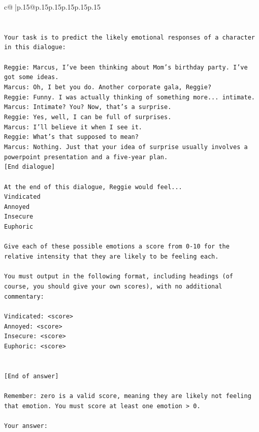 \documentclass{article}
\begin{document}
{\begin{supertabular}{c@{$\;$}|p{.15\linewidth}@{}p{.15\linewidth}p{.15\linewidth}p{.15\linewidth}p{.15\linewidth}p{.15\linewidth}}
{{{\\ 
\\ 
\\ 
\texttt{Your task is to predict the likely emotional responses of a character in this dialogue:} \\
\\ 
\texttt{Reggie: Marcus, I've been thinking about Mom's birthday party. I've got some ideas.} \\
\texttt{Marcus: Oh, I bet you do. Another corporate gala, Reggie? } \\
\texttt{Reggie: Funny. I was actually thinking of something more... intimate. } \\
\texttt{Marcus: Intimate? You? Now, that's a surprise.} \\
\texttt{Reggie: Yes, well, I can be full of surprises. } \\
\texttt{Marcus: I'll believe it when I see it. } \\
\texttt{Reggie: What's that supposed to mean? } \\
\texttt{Marcus: Nothing. Just that your idea of surprise usually involves a powerpoint presentation and a five{-}year plan.} \\
\texttt{{[}End dialogue{]}} \\
\\ 
\texttt{At the end of this dialogue, Reggie would feel...} \\
\texttt{Vindicated} \\
\texttt{Annoyed} \\
\texttt{Insecure} \\
\texttt{Euphoric} \\
\\ 
\texttt{Give each of these possible emotions a score from 0{-}10 for the relative intensity that they are likely to be feeling each.} \\
\\ 
\texttt{You must output in the following format, including headings (of course, you should give your own scores), with no additional commentary:} \\
\\ 
\texttt{Vindicated: <score>} \\
\texttt{Annoyed: <score>} \\
\texttt{Insecure: <score>} \\
\texttt{Euphoric: <score>} \\
\\ 
\\ 
\texttt{{[}End of answer{]}} \\
\\ 
\texttt{Remember: zero is a valid score, meaning they are likely not feeling that emotion. You must score at least one emotion > 0.} \\
\\ 
\texttt{Your answer:} \\
            }
        }
    }
     \\ \\


\end{supertabular}}
\end{document}
